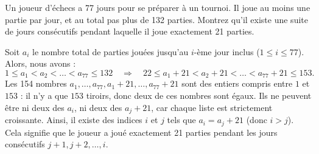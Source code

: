 \begin{problem}
    Un joueur d'échecs a 77 jours pour se préparer à un tournoi.
    Il joue au moins une partie par jour, et au total pas plus de 132 parties.
    Montrez qu'il existe une suite de jours consécutifs pendant laquelle il joue exactement 21 parties.

    \begin{solution}
        Soit \( a_i \) le nombre total de parties jouées jusqu'au \( i \)-ème jour inclus (\( 1 \leq i \leq 77 \)).
        Alors, nous avons :
        \[
        1 \leq a_1 < a_2 < \ldots < a_{77} \leq 132 \quad \Rightarrow \quad 22 \leq a_1 + 21 < a_2 + 21 < \ldots < a_{77} + 21 \leq 153.
        \]
        Les 154 nombres \( a_1, \dots, a_{77}, a_1 + 21, \dots, a_{77} + 21 \) sont des entiers compris entre \( 1 \) et \( 153 \) : il n'y a que \( 153 \) tiroirs, donc deux de ces nombres sont égaux. Ils ne peuvent être ni deux des \( a_i \), ni deux des \( a_j+21 \), car chaque liste est strictement croissante.
        Ainsi, il existe des indices \( i \) et \( j \) tels que \( a_i = a_j + 21 \) (donc \( i > j \)). Cela signifie que le joueur a joué exactement 21 parties pendant les jours consécutifs \( j+1, j+2, \dots, i \).
    \end{solution}
\end{problem}

